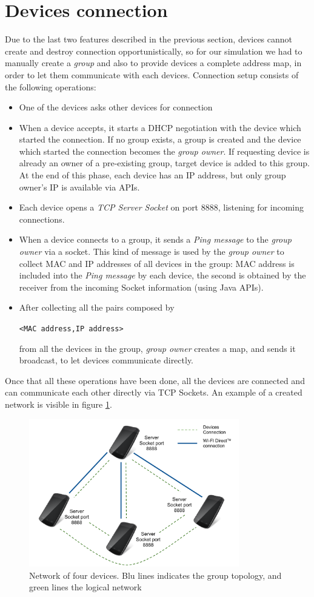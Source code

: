 \section{Devices connection}

Due to the last two \direct features described in the previous section, devices cannot create and destroy connection opportunistically, so for our simulation we had to 
manually create a \direct \textit{group} and also to provide devices a complete address map, in order to let them communicate with each
devices.
Connection setup consists of the following operations:
	\begin{itemize}
		\item One of the devices asks other devices for connection
		\item When a device accepts, it starts a DHCP negotiation with the device which started the connection. If no \direct group exists, a group is created and the device which started the connection becomes the \textit{group owner}. If requesting device is already an owner of a pre-existing group, target device is added to this group. At the end of this phase, each device has an IP address, but only group owner's IP is available via \direct APIs. 
		\item Each device opens a \textit{TCP Server Socket} on port 8888, listening for incoming connections.
		\item When a device connects to a group, it sends a \textit{Ping message} to the \textit{group owner} via a socket. This kind of message is used by the \textit{group owner} to collect MAC and IP addresses of all devices in the group: MAC address is included into the \emph{Ping message} by each device, the second is obtained by the receiver from the incoming Socket information (using Java APIs).
		\item After collecting all the pairs composed by \begin{center}\tt{<MAC address,IP address>}\end{center} from all the devices in the group, \textit{group owner} creates a map, and sends it broadcast, to let devices communicate directly.
	\end{itemize}
	
Once that all these operations have been done, all the devices are connected and can communicate each other directly via TCP Sockets. An example of a created network is visible in figure \ref{fig:device_network}.

\begin{figure}[!htbp]
\centering
\includegraphics[width=3.6in]{imgs/Devices_network.pdf}
\caption{Network of four devices. Blu lines indicates the \direct group topology, and green lines the logical network}
\label{fig:device_network}
\end{figure}
